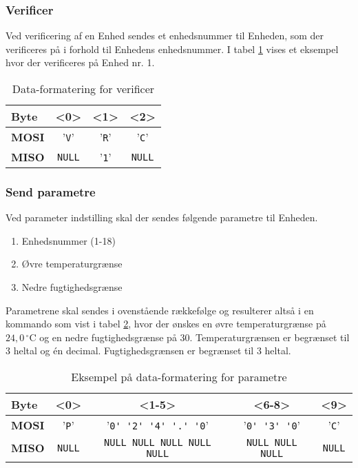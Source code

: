 \subsubsection{Verificer}

Ved verificering af en Enhed sendes et enhedsnummer til Enheden, som der verificeres på i forhold til Enhedens enhedsnummer. I tabel \ref{table:SWProtokol-verificer} vises et eksempel hvor der verificeres på Enhed nr. 1.

\begin{table}[H]
	\caption{Data-formatering for verificer}
	\centering
	\begin{tabular}{|l|c|c|c|}
		\hline 
		\textbf{Byte} & \textbf{<0>} & \textbf{<1>} & \textbf{<2>}   \\ 
		\hline 
		\textbf{MOSI} & '\verb+V+' & '\verb+R+' & '\verb+C+' \\ 
		\hline 
		\textbf{MISO} & \verb+NULL+ & '\verb+1+' & \verb+NULL+ \\ 
		\hline 
	\end{tabular} 
	\label{table:SWProtokol-verificer}
\end{table}

\subsubsection{Send parametre}

Ved parameter indstilling skal der sendes følgende parametre til Enheden.

\begin{enumerate}
	\item Enhedsnummer (1-18)
	\item Øvre temperaturgrænse
	\item Nedre fugtighedsgrænse
\end{enumerate}

Parametrene skal sendes i ovenstående rækkefølge og resulterer altså i en kommando som vist i tabel \ref{table:SWProtokol-para}, hvor der ønskes en øvre temperaturgrænse på $24,0\,^{\circ}\mathrm{C}$ og en nedre fugtighedsgrænse på 30. Temperaturgrænsen er begrænset til 3 heltal og én decimal. Fugtighedsgrænsen er begrænset til 3 heltal.

\begin{table}[H]
	\caption{Eksempel på data-formatering for parametre}
	\centering
	\begin{tabular}{|l|c|c|c|c|}
		\hline 
		\textbf{Byte} & \textbf{<0>} & \textbf{<1-5>} & \textbf{<6-8>} & \textbf{<9>} \\ 
		\hline 
		\textbf{MOSI} & '\verb+P+' & '\verb+0' '2' '4' '.' '0+' & '\verb+0' '3' '0+' & '\verb+C+' \\ 
		\hline 
		\textbf{MISO} & \verb+NULL+ & \verb+NULL NULL NULL NULL NULL+ & \verb+NULL NULL NULL+ & \verb+NULL+\\ 
		\hline 
	\end{tabular} 
	\label{table:SWProtokol-para}
\end{table}

